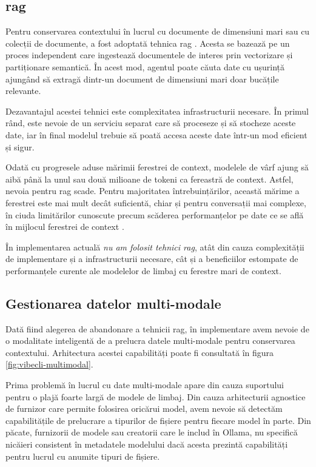 \documentclass[12pt, a4paper, oneside, romanian]{teza-upb}
\begin{document}
      \subsection{\ac{rag}}

      Pentru conservarea contextului în lucrul cu documente de dimensiuni mari sau cu colecții de documente, a fost adoptată tehnica \ac{rag} \cite{lewisRetrievalAugmentedGenerationKnowledgeIntensive2020}. Acesta se bazează pe
      un proces independent care ingestează documentele de interes prin vectorizare și partiționare semantică. În acest mod, agentul poate căuta date cu ușurință ajungând să extragă dintr-un document de dimensiuni mari doar bucățile relevante.

      Dezavantajul acestei tehnici este complexitatea infrastructurii necesare. În primul rând, este nevoie de un serviciu separat care să proceseze și să stocheze aceste date, iar în final modelul trebuie să poată accesa aceste date într-un mod eficient și sigur.

      Odată cu progresele aduse mărimii ferestrei de context, modelele de vârf ajung să aibă până la unul sau două milioane de tokeni ca fereastră de context. Astfel, nevoia pentru \ac{rag} scade. Pentru majoritatea
      întrebuințărilor, această mărime a ferestrei este mai mult decât suficientă, chiar și pentru conversații mai complexe, în ciuda limitărilor cunoscute precum scăderea performanțelor pe date ce se află în mijlocul ferestrei de context \cite{liuLostMiddleHow2024}. 

      În implementarea actuală \textit{nu am folosit tehnici \ac{rag}}, atât din cauza complexității de implementare și a infrastructurii necesare, cât și a beneficiilor estompate de performanțele curente ale modelelor de limbaj cu ferestre mari de context.

      \subsection{Gestionarea datelor multi-modale}

      Dată fiind alegerea de abandonare a tehnicii \ac{rag}, în implementare avem nevoie de o modalitate inteligentă de a prelucra datele multi-modale pentru conservarea contextului. Arhitectura acestei capabilități poate fi consultată în figura \ref{fig:vibecli-multimodal}.

      Prima problemă în lucrul cu date multi-modale apare din cauza suportului pentru o plajă foarte largă de modele de limbaj. Din cauza arhitecturii
      agnostice de furnizor care permite folosirea oricărui model, avem nevoie să detectăm capabilitățile de prelucrare a tipurilor de fișiere pentru fiecare model în parte. Din păcate,
      furnizorii de modele sau creatorii care le includ în Ollama, nu specifică nicăieri consistent în metadatele modelului dacă acesta prezintă capabilități pentru lucrul cu anumite tipuri de fișiere.
\end{document}
